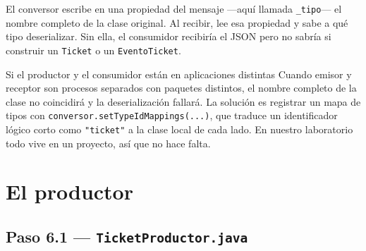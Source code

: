 \documentclass[11pt,a4paper]{book}
\newcommand{\clase}[1]{\texttt{#1}}
\begin{document}
El conversor escribe en una propiedad del mensaje ---aquí llamada \texttt{\_tipo}--- el nombre completo de la clase original.
Al recibir, lee esa propiedad y sabe a qué tipo deserializar.
Sin ella, el consumidor recibiría el JSON pero no sabría si construir un \clase{Ticket} o un \clase{EventoTicket}.

\begin{cajaNota}{Si el productor y el consumidor están en aplicaciones distintas}
	Cuando emisor y receptor son procesos separados con paquetes distintos, el nombre completo de la clase no coincidirá y la deserialización fallará.
	La solución es registrar un mapa de tipos con \texttt{conversor.setTypeIdMappings(...)}, que traduce un identificador lógico corto como \texttt{"ticket"} a la clase local de cada lado.
	En nuestro laboratorio todo vive en un proyecto, así que no hace falta.
\end{cajaNota}

\chapter{El productor}
\label{cap:productor}

\section{Paso 6.1 --- \texttt{TicketProductor.java}}
\end{document}
